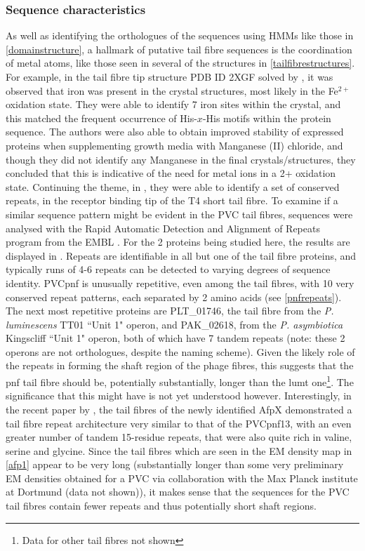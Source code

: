 \subsubsection{Sequence characteristics}
As well as identifying the orthologues of the sequences using HMMs like those in \vref{domainstructure}, a hallmark of putative tail fibre sequences is the coordination of metal atoms, like those seen in several of the structures in \vref{tailfibrestructures}. For example, in the tail fibre tip structure PDB ID 2XGF solved by \cite{Bartual2010}, it was observed that iron was present in the crystal structures, most likely in the Fe$^{2+}$ oxidation state. They were able to identify 7 iron sites within the crystal, and this matched the frequent occurrence of His-$x$-His motifs within the protein sequence. The authors were also able to obtain improved stability of expressed proteins when supplementing growth media with Manganese (II) chloride, and though they did not identify any Manganese in the final crystals/structures, they concluded that this is indicative of the need for metal ions in a 2+ oxidation state. Continuing the theme, in \cite{VanRaaij2001}, they were able to identify a set of conserved repeats, in the receptor binding tip of the T4 short tail fibre. To examine if a similar sequence pattern might be evident in the PVC tail fibres, sequences were analysed with the Rapid Automatic Detection and Alignment of Repeats program from the EMBL \citep{Heger2000}. For the 2 proteins being studied here, the results are displayed in . Repeats are identifiable in all but one of the tail fibre proteins, and typically runs of 4-6 repeats can be detected to varying degrees of sequence identity. PVCpnf is unusually repetitive, even among the tail fibres, with 10 very conserved repeat patterns, each separated by 2 amino acids (see \vref{pnfrepeats}). The next most repetitive proteins are PLT\_01746, the tail fibre from the \emph{P. luminescens} TT01 ``Unit 1" operon, and PAK\_02618, from the \emph{P. asymbiotica} Kingscliff ``Unit 1" operon, both of which have 7 tandem repeats (note: these 2 operons are not orthologues, despite the naming scheme). Given the likely role of the repeats in forming the shaft region of the phage fibres, this suggests that the pnf tail fibre should be, potentially substantially, longer than the lumt one\footnote{Data for other tail fibres not shown}. The significance that this might have is not yet understood however. Interestingly, in the recent paper by \cite{Hurst2008}, the tail fibres of the newly identified AfpX demonstrated a tail fibre repeat architecture very similar to that of the PVCpnf13, with an even greater number of tandem 15-residue repeats, that were also quite rich in valine, serine and glycine. Since the tail fibres which are seen in the EM density map in \vref{afp1} appear to be very long (substantially longer than some very preliminary EM densities obtained for a PVC via collaboration with the Max Planck institute at Dortmund (data not shown)), it makes sense that the sequences for the PVC tail fibres contain fewer repeats and thus potentially short shaft regions.

